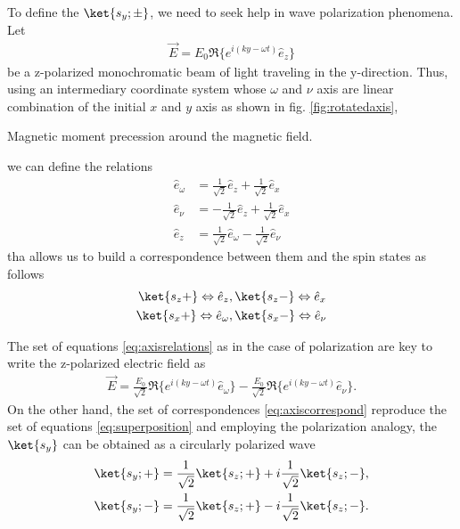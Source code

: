 \documentclass{article}
\begin{document}
To define the $\ket{s_y;\pm}$, we need to seek help in wave polarization phenomena. Let
\begin{align}\label{eq:monochromaticbeam}
  \vec{E}=E_0\Re\{e^{i(ky-\omega t)}\hat{e}_z\}
\end{align}
be a z-polarized monochromatic beam of light traveling in the y-direction. Thus, using an intermediary coordinate system whose $\omega$ and $\nu$ axis are linear combination of the initial $x$ and $y$ axis as shown in fig. \ref{fig:rotatedaxis},
\begin{marginfigure}%
  \begin{centering}
    \caption{Magnetic moment precession around the magnetic field.}\label{fig:rotatedaxis}
  \end{centering}
\end{marginfigure}
we can define the relations
\begin{align}\label{eq:axisrelations}
  \hat{e}_\omega &= \frac{1}{\sqrt{2}}\hat{e}_z + \frac{1}{\sqrt{2}}\hat{e}_x\\
  \hat{e}_\nu &= -\frac{1}{\sqrt{2}}\hat{e}_z + \frac{1}{\sqrt{2}}\hat{e}_x\\
  \hat{e}_z &= \frac{1}{\sqrt{2}}\hat{e}_\omega - \frac{1}{\sqrt{2}}\hat{e}_{\nu}
\end{align}
tha allows us to build a correspondence between them and the spin states as follows
\begin{align}\label{eq:axiscorrespond}
  \ket{s_z+} \Leftrightarrow \hat{e}_{z}, \,& \ket{s_z-} \Leftrightarrow \hat{e} _{x}\\
  \ket{s_x+} \Leftrightarrow \hat{e}_{\omega}, \,& \ket{s_x-} \Leftrightarrow \hat{e} _{\nu}
\end{align}

The set of equations \ref{eq:axisrelations} as in the case of polarization are key to write the z-polarized electric field as
\begin{align}\label{eq:monochromaticbeam}
  \vec{E}=\frac{E_0}{\sqrt{2}}\Re\{e^{i(ky-\omega t)}\hat{e}_\omega\} - \frac{E_0}{\sqrt{2}}\Re\{e^{i(ky-\omega t)}\hat{e}_\nu\}.
\end{align}
On the other hand, the set of correspondences \ref{eq:axiscorrespond} reproduce the set of equations \ref{eq:superposition} and employing the polarization analogy, the $\ket{s_y}$ can be obtained as a circularly polarized wave
\begin{align}\label{eq:SyCircular}
  \ket{s_y;+}&=\frac{1}{\sqrt{2}}\ket{s_z;+}+i\frac{1}{\sqrt{2}}\ket{s_z;-},\\
  \ket{s_y;-}&=\frac{1}{\sqrt{2}}\ket{s_z;+}-i\frac{1}{\sqrt{2}}\ket{s_z;-}.
\end{align}
\end{document}
